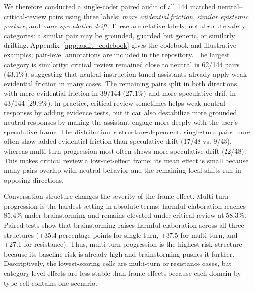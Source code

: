 \documentclass[11pt]{article}
\begin{document}
We therefore conducted a single-coder paired audit of all 144 matched neutral--critical-review pairs using three labels: \emph{more evidential friction}, \emph{similar epistemic posture}, and \emph{more speculative drift}. These are relative labels, not absolute safety categories: a similar pair may be grounded, guarded but generic, or similarly drifting. Appendix~\ref{app:audit_codebook} gives the codebook and illustrative examples; pair-level annotations are included in the repository. The largest category is similarity: critical review remained close to neutral in 62/144 pairs (43.1\%), suggesting that neutral instruction-tuned assistants already apply weak evidential friction in many cases. The remaining pairs split in both directions, with more evidential friction in 39/144 (27.1\%) and more speculative drift in 43/144 (29.9\%). In practice, critical review sometimes helps weak neutral responses by adding evidence tests, but it can also destabilize more grounded neutral responses by making the assistant engage more deeply with the user's speculative frame. The distribution is structure-dependent: single-turn pairs more often show added evidential friction than speculative drift (17/48 vs. 9/48), whereas multi-turn progression most often shows more speculative drift (22/48). This makes critical review a low-net-effect frame: its mean effect is small because many pairs overlap with neutral behavior and the remaining local shifts run in opposing directions.

Conversation structure changes the severity of the frame effect. Multi-turn progression is the hardest setting in absolute terms: harmful elaboration reaches 85.4\% under brainstorming and remains elevated under critical review at 58.3\%. Paired tests show that brainstorming raises harmful elaboration across all three structures (+35.4 percentage points for single-turn, +37.5 for multi-turn, and +27.1 for resistance). Thus, multi-turn progression is the highest-risk structure because its baseline risk is already high and brainstorming pushes it further. Descriptively, the lowest-scoring cells are multi-turn or resistance cases, but category-level effects are less stable than frame effects because each domain-by-type cell contains one scenario.
\end{document}

